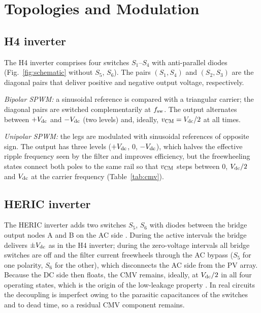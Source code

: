 \section{Topologies and Modulation}
\label{sec:topologies}

\subsection{H4 inverter}
The H4 inverter comprises four switches $S_1$--$S_4$ with anti-parallel diodes (Fig.~\ref{fig:schematic} without $S_5$, $S_6$). The pairs $(S_1,S_4)$ and $(S_2,S_3)$ are the diagonal pairs that deliver positive and negative output voltage, respectively.

\emph{Bipolar SPWM:} a sinusoidal reference is compared with a triangular carrier; the diagonal pairs are switched complementarily at $f_{\mathrm{sw}}$. The output alternates between $+V_{\mathrm{dc}}$ and $-V_{\mathrm{dc}}$ (two levels) and, ideally, $v_{\mathrm{CM}}=V_{\mathrm{dc}}/2$ at all times.

\emph{Unipolar SPWM:} the legs are modulated with sinusoidal references of opposite sign. The output has three levels ($+V_{\mathrm{dc}}$, $0$, $-V_{\mathrm{dc}}$), which halves the effective ripple frequency seen by the filter and improves efficiency, but the freewheeling states connect both poles to the same rail so that $v_{\mathrm{CM}}$ steps between $0$, $V_{\mathrm{dc}}/2$ and $V_{\mathrm{dc}}$ at the carrier frequency (Table~\ref{tab:cmv}).

\subsection{HERIC inverter}
The HERIC inverter adds two switches $S_5$, $S_6$ with diodes between the bridge output nodes A and B on the AC side \cite{Schmidt2003}. During the active intervals the bridge delivers $\pm V_{\mathrm{dc}}$ as in the H4 inverter; during the zero-voltage intervals all bridge switches are off and the filter current freewheels through the AC bypass ($S_5$ for one polarity, $S_6$ for the other), which disconnects the AC side from the PV array. Because the DC side then floats, the CMV remains, ideally, at $V_{\mathrm{dc}}/2$ in all four operating states, which is the origin of the low-leakage property \cite{Araujo2010,Sundar2016}. In real circuits the decoupling is imperfect owing to the parasitic capacitances of the switches and to dead time, so a residual CMV component remains.

